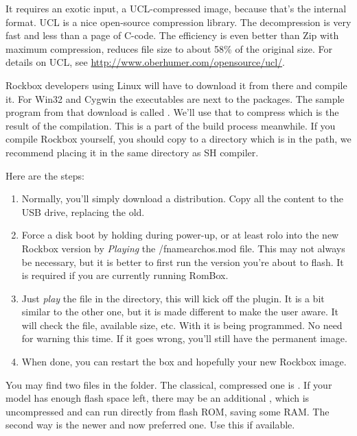 It requires an exotic input, a UCL-compressed image, because that's the internal 
format. UCL is a nice open-source compression library. The decompression is very 
fast and less than a page of C-code. The efficiency is even better than Zip with 
maximum compression, reduces file size to about 58\% of the original size. For 
details on UCL, see \url{http://www.oberhumer.com/opensource/ucl/}.

Rockbox developers using Linux will have to download it from there and compile 
it. For Win32 and Cygwin the executables are next to the packages. The sample 
program from that download is called . We'll use that to compress 
 which is the result of the compilation. This is a part of the
build process meanwhile. If you compile Rockbox yourself, you should copy 
 to a directory which is in the path, we recommend placing it in 
the same directory as SH compiler.


Here are the steps:

\begin{enumerate}
\item Normally, you'll simply download a  distribution. Copy all the 
  content to the USB drive, replacing the old.
\item Force a disk boot by holding  during power-up, or at least rolo into
  the new Rockbox version by \emph{Playing} the /fname{archos.mod} file. This may not always be necessary, but it is better to first run the 
  version you're about to flash. It is required if you are currently running 
  RomBox.
\item Just \emph{play} the  file in the  directory, 
  this will kick off the  plugin. It is a bit similar 
  to the other one, but it is made different to make the user aware. It will check
  the file, available size, etc. With  it is being programmed. No need for 
  warning this time. If it goes wrong, you'll still have the permanent image.
\item When done, you can restart the box and hopefully your new Rockbox image.
\end{enumerate}

You may find two  files in the  folder. The 
classical, compressed one is . If your model has enough flash 
space left, there may be an additional , which is uncompressed 
and can run directly from flash ROM, saving some RAM. The second way is the newer
and now preferred one. Use this if available.

